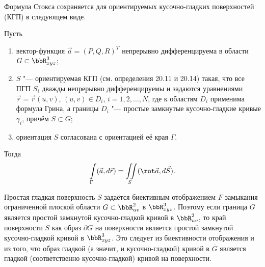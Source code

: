 Формула Стокса сохраняется для ориентируемых кусочно-гладких поверхностей (КГП) в следующем виде.

\begin{thmn}
Пусть
\begin{enumerate}
\item[$1^\circ$.] вектор-функция $\vec{a} = (P, Q, R)^T$ непрерывно дифференцируема в области $G \subset \bbR^3_{xyz}$;
\item[$2^\circ$.] $S$ "--- ориентируемая КГП (см. определения 20.11 и 20.14) такая, что все ПГП $S_i$ дважды непрерывно дифференцируемы и задаются уравнениями $\vec{r} = \vec{r}(u, v)$, $(u, v) \in \overline{D}_i$, $i = 1, 2, \ldots, N$, где к областям $D_i$ применима формула Грина, а границы $D_i$ "--- простые замкнутые кусочно-гладкие кривые $\gamma_i$, причём $S \subset G$;
\item[$3^\circ$.] ориентация $S$ согласована с ориентацией её края $\Gamma$.
\end{enumerate}
Тогда
$$
\int\limits_\Gamma (\vec{a}, d\vec{r}) = \iint\limits_S (\rot \vec{a}, d\vec{S}).
$$
\end{thmn}

\begin{notion}
    Простая гладкая поверхность $S$ задаётся биективным отображением $F$ замыкания ограниченной плоской области $G \subset \bbR^2_{uv}$ в $\bbR^3_{xyz}$. Поэтому если граница $G$ является простой замкнутой кусочно-гладкой кривой в $\bbR^2_{uv}$, то край поверхности $S$ как образ $\partial G$ на поверхности является простой замкнутой кусочно-гладкой кривой в $\bbR^3_{xyz}$. Это следует из биективности отображения и из того, что образ гладкой (а значит, и кусочно-гладкой) кривой в $\overline{G}$ является гладкой (соответственно кусочно-гладкой) кривой на поверхности.
\end{notion}


